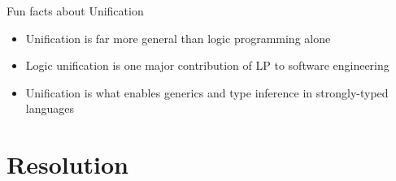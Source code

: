 \documentclass[presentation]{beamer}\mode<presentation>{\usetheme{AMSBolognaFC}}
\begin{document}
\begin{frame}{Fun facts about Unification}
    \begin{itemize}
        \item Unification is far more general than logic programming alone
        
        \vfill

        \item Logic unification is one major contribution of LP to \alert{software engineering}
        
        \vfill

        \item Unification is what enables \alert{generics} and \alert{type inference} in strongly-typed languages
    \end{itemize}
\end{frame}

\section{Resolution}
\end{document}
